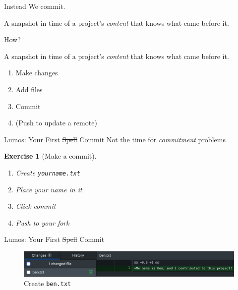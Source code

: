 \documentclass{beamer}
\theoremstyle{example}
\newtheorem{exercise}{Exercise}
\begin{document}
\begin{frame}{Instead}
    We commit.

    \begin{definition}[Commit]
        A snapshot in time of a project's \emph{content} that knows what came
        before it.
    \end{definition}
\end{frame}

\begin{frame}{How?}
    \begin{definition}[Commit]
        A snapshot in time of a project's \emph{content} that knows what came
        before it.
    \end{definition}
    \begin{enumerate}
        \item Make changes
        \item Add files
        \item Commit
        \item (Push to update a remote)
    \end{enumerate}
\end{frame}

\begin{frame}[fragile]{Lumos: Your First \sout{Spell} Commit}
    {Not the time for \emph{commitment} problems}
    \begin{exercise}[Make a commit]
        \begin{enumerate}
            \item Create \texttt{yourname.txt}
            \item Place your name in it
            \item Click commit
            \item Push to your fork
        \end{enumerate}
    \end{exercise}
\end{frame}

\begin{frame}{Lumos: Your First \sout{Spell} Commit}
    \begin{figure}
        \includegraphics[scale=0.4]{img/create_ben}
        \caption{Create \texttt{ben.txt}}
    \end{figure}
\end{frame}
\end{document}
